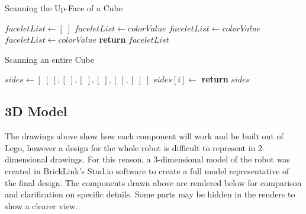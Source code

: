 \documentclass{report}
\begin{document}
	\begin{algorithm}[h!]
		\caption{Scanning the Up-Face of a Cube}\label{alg:scanupface}
		\begin{algorithmic}[1]
				\State $faceletList\gets [\;]$
					\State {}
					\State $faceletList\gets colorValue$
					\State {}
					\State
					\State {}
					\State $faceletList\gets colorValue$
					\State {}
				\EndFor
				\State {}
				\State $faceletList\gets colorValue$
				\State \textbf{return} $faceletList$
			\EndFunction
		\end{algorithmic}
	\end{algorithm}

	\begin{algorithm}[h!]
		\caption{Scanning an entire Cube}\label{alg:scancube}
		\begin{algorithmic}[1]
				\State $sides\gets [\;[\;], [\;], [\;], [\;], [\;], [\;]\;]$
					\State $sides[i] \gets$ 
						\State {}
					\EndIf
						\State {}
					\EndIf
						\State {}
					\EndIf
				\EndFor
				\State \textbf{return} $sides$
			\EndFunction
		\end{algorithmic}
	\end{algorithm}

	\newpage
	\subsection{3D Model}
	
	The drawings above show how each component will work and be built out of Lego, however a design for the whole robot is difficult to represent in 2-dimensional drawings. For this reason, a 3-dimensional model of the robot was created in BrickLink's Stud.io software \cite{BrickLink} to create a full model representative of the final design. The components drawn above are rendered below for comparison and clarification on specific details. Some parts may be hidden in the renders to show a clearer view.
	
\end{document}
